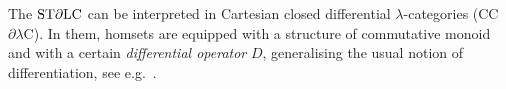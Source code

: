 
The $\mathrm{ST}\partial\mathrm{LC}$ can be interpreted in Cartesian closed differential $\lambda$-categories (CC$\partial\lambda$C)\cite{Manzo2010,Blute2009, Blute2019}.
In them, homsets are equipped with a structure of commutative monoid %
and with a certain \emph{differential operator} $D$, generalising the usual notion of differentiation, see e.g.\ \cite{BluteEhrhTass10}.

